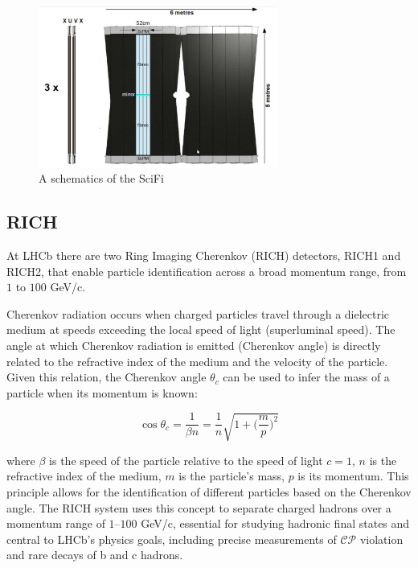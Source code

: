 \begin{figure}
    \centering
    \includegraphics[width=0.7\textwidth]{figures/scifi.png}
    \caption{A schematics of the SciFi}
    \label{fig:scifi}
\end{figure}


\subsection{RICH}
At LHCb there are two Ring Imaging Cherenkov (RICH) detectors, RICH1 and RICH2, that enable particle identification\cite{LHCb:2013urp} across a broad momentum range, from $1$ to $100$ GeV/c\cite{Adinolfi_2013}.

Cherenkov radiation occurs when charged particles travel through a dielectric medium at speeds exceeding the local speed of light (superluminal speed). The angle at which Cherenkov radiation is emitted (Cherenkov angle) is directly related to the refractive index of the medium and the velocity of the particle. Given this relation, the Cherenkov angle $\theta_c$ can be used to infer the mass of a particle when its momentum is known:

\begin{equation}
    \cos\theta_c=\frac{1}{\beta n} = \frac{1}{n}\sqrt{1+\biggl(\frac{m}{p}\biggr)^2}
\end{equation}

where $\beta$ is the speed of the particle relative to the speed of light $c=1$, $n$ is the refractive index of the medium, $m$ is the particle's mass, $p$ is its momentum.
This principle allows for the identification of different particles based on the Cherenkov angle. The RICH system uses this concept to separate charged hadrons over a momentum range of $1–100$ GeV/c, essential for studying hadronic final states and central to LHCb's physics goals, including precise measurements of $\mathcal{CP}$ violation and rare decays of b and c hadrons.

